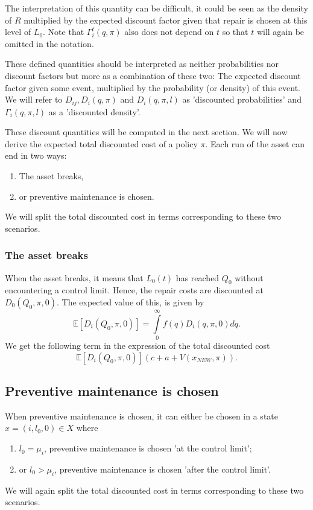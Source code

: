 The interpretation of this quantity can be difficult, it could be seen as the density of $R$ multiplied by the expected discount factor given that repair is chosen at this level of $L_0$.
Note that $\Gamma_i^t(q,\pi)$ also does not depend on $t$ so that $t$ will again be omitted in the notation.
\begin{remark}
	These defined quantities should be interpreted as neither probabilities nor discount factors but more as a combination of these two: The expected discount factor given some event, multiplied by the probability (or density) of this event.
	We will refer to $D_{ij},D_{i}(q,\pi)$ and $D_{i}(q,\pi,l)$ as 'discounted probabilities' and $\Gamma_i(q,\pi,l)$ as a 'discounted density'.
\end{remark}
These discount quantities will be computed in the next section.
We will now derive the expected total discounted cost of a policy $\pi$.
Each run of the asset can end in two ways:
\begin{enumerate}
	\item The asset breaks,
	\item or preventive maintenance is chosen.
\end{enumerate}
We will split the total discounted cost in terms corresponding to these two scenarios.

\subsubsection{The asset breaks}
When the asset breaks, it means that $L_0(t)$ has reached $Q_0$ without encountering a control limit.
Hence, the repair costs are discounted at $D_0(Q_0,\pi,0)$.
The expected value of this, is given by
\[
\mathbb{E}[D_{i}(Q_0,\pi,0)]=\int\limits_0^\infty f(q)D_{i}(q,\pi,0)dq.
\]
We get the following term in the expression of the total discounted cost
\[
\mathbb{E}[D_{i}(Q_0,\pi,0)](c+a+V(x_{NEW},\pi)).
\]

\subsection{Preventive maintenance is chosen}
When preventive maintenance is chosen, it can either be chosen in a state $x=(i,l_0,0)\in X$ where
\begin{enumerate}
	\item $l_0=\mu_i$, preventive maintenance is chosen 'at the control limit';
	\item or $l_0>\mu_i$, preventive maintenance is chosen 'after the control limit'.
\end{enumerate}
We will again split the total discounted cost in terms corresponding to these two scenarios.

